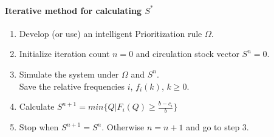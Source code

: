 \paragraph{Iterative method for calculating $S^*$}

\begin{enumerate}
	\tightlist
	\item Develop (or use) an intelligent Prioritization rule $\Omega$.
	\item Initialize iteration count $n=0$ and circulation stock vector $S^n=0$.
	\item Simulate the system under $\Omega$ and $S^n$.\\
	Save the relative frequencies $i$, $f_i(k)$, $k\ge0$.
	\item Calculate $S^{n+1} = min\{Q|F_i(Q)\ge \frac{b-c_i}{b}\}$
	\item Stop when $S^{n+1} = S^n$. Otherwise $n = n+1$ and go to step 3.
\end{enumerate}